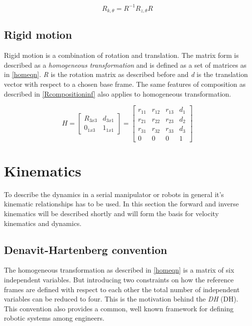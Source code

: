 \begin{equation}\label{axisanglerot}
R_{k,\theta} = R^{-1} R_{z,\theta} R
\end{equation}

\subsection{Rigid motion}

Rigid motion is a combination of rotation and translation. The matrix form is described as a \textit{homogeneous transformation} and is defined as a set of matrices as in \eqref{homeqn}. \textit{R} is the rotation matrix as described before and \textit{d} is the translation vector with respect to a chosen base frame. The same features of composition as described in \eqref{Rcompositioninf} also applies to homogeneous transformation.

\begin{equation}\label{homeqn}
H = \begin{bmatrix}
R_{3x3} & d_{3x1}\\ 
0_{1x3} & 1_{1x1}
\end{bmatrix}=\begin{bmatrix}
r_{11} & r_{12} & r_{13} & d_{1}\\ 
r_{21} & r_{22} & r_{23} & d_{2}\\ 
r_{31} & r_{32} & r_{33} & d_{3}\\ 
0 & 0 & 0 & 1
\end{bmatrix}
\end{equation}


\section{Kinematics}

To describe the dynamics in a serial manipulator or robots in general it's kinematic relationships has to be used. In this section the forward and inverse kinematics will be described shortly and will form the basis for velocity kinematics and dynamics.

\subsection{Denavit-Hartenberg convention}

The homogeneous transformation as described in \eqref{homeqn} is a matrix of six independent variables. But introducing two constraints on how the reference frames are defined with respect to each other the total number of independent variables can be reduced to four. This is the motivation behind the \textit{\gls{DH}} (DH). This convention also provides a common, well known framework for defining robotic systems among engineers.

